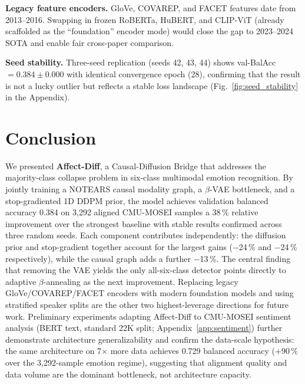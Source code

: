 \documentclass[conference]{IEEEtran}
\begin{document}
\textbf{Legacy feature encoders.}  GloVe, COVAREP, and FACET features date
from 2013--2016.  Swapping in frozen RoBERTa, HuBERT, and CLIP-ViT (already
scaffolded as the ``foundation'' encoder mode) would close the gap to 2023--2024
SOTA and enable fair cross-paper comparison.

\textbf{Seed stability.}  Three-seed replication (seeds 42, 43, 44) shows
val-BalAcc $= 0.384 \pm 0.000$ with identical convergence epoch (28), confirming
that the result is not a lucky outlier but reflects a stable loss landscape
(Fig.~\ref{fig:seed_stability} in the Appendix).

\section{Conclusion}

We presented \textbf{Affect-Diff}, a Causal-Diffusion Bridge that addresses
the majority-class collapse problem in six-class multimodal emotion recognition.
By jointly training a NOTEARS causal modality graph, a $\beta$-VAE bottleneck,
and a stop-gradiented 1D DDPM prior, the model achieves validation balanced
accuracy 0.384 on 3{,}292 aligned CMU-MOSEI samples a 38\,\% relative
improvement over the strongest baseline with stable results confirmed across
three random seeds.
Each component contributes independently: the diffusion prior and stop-gradient
together account for the largest gains ($-$24\,\% and $-$24\,\% respectively),
while the causal graph adds a further $-$13\,\%.
The central finding that removing the VAE yields the only all-six-class
detector points directly to adaptive $\beta$-annealing as the next
improvement.  Replacing legacy GloVe/COVAREP/FACET encoders with modern
foundation models and using stratified speaker splits are the other two
highest-leverage directions for future work.
Preliminary experiments adapting Affect-Diff to CMU-MOSEI sentiment analysis
(BERT text, standard 22K split; Appendix~\ref{app:sentiment}) further
demonstrate architecture generalizability and confirm the data-scale hypothesis:
the same architecture on 7$\times$ more data achieves 0.729 balanced accuracy
(+90\,\% over the 3{,}292-sample emotion regime), suggesting that alignment
quality and data volume are the dominant bottleneck, not architecture capacity.
\end{document}
